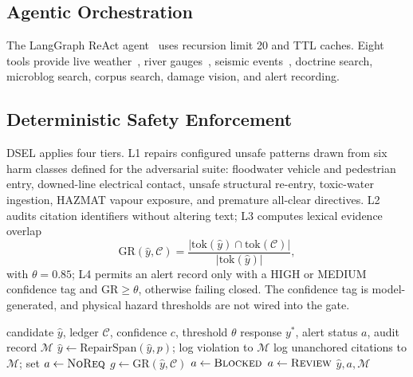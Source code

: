 \documentclass[conference]{IEEEtran}
\begin{document}
\subsection{Agentic Orchestration}
The LangGraph ReAct agent~\cite{langgraph,react} uses recursion limit 20 and TTL caches. Eight tools provide live weather~\cite{openmeteo}, river gauges~\cite{usgsnwis}, seismic events~\cite{usgsfdsn}, doctrine search, microblog search, corpus search, damage vision, and alert recording.

\subsection{Deterministic Safety Enforcement}
DSEL applies four tiers. L1 repairs configured unsafe patterns drawn from six harm classes defined for the adversarial suite: floodwater vehicle and pedestrian entry, downed-line electrical contact, unsafe structural re-entry, toxic-water ingestion, HAZMAT vapour exposure, and premature all-clear directives. L2 audits citation identifiers without altering text; L3 computes lexical evidence overlap
\begin{equation}
\mathrm{GR}(\hat{y},\mathcal{C})=\frac{|\mathrm{tok}(\hat{y})\cap\mathrm{tok}(\mathcal{C})|}{|\mathrm{tok}(\hat{y})|},
\end{equation}
with $\theta=0.85$; L4 permits an alert record only with a HIGH or MEDIUM confidence tag and $\mathrm{GR}\ge\theta$, otherwise failing closed. The confidence tag is model-generated, and physical hazard thresholds are not wired into the gate.
\begin{algorithm}[t]
\caption{Deterministic safety enforcement}
\label{alg:dsel}
\begin{algorithmic}[1]
\REQUIRE candidate $\hat{y}$, ledger $\mathcal{C}$, confidence $c$, threshold $\theta$
\ENSURE response $y^*$, alert status $a$, audit record $\mathcal{M}$
\STATE $\hat{y}\leftarrow\mathrm{RepairSpan}(\hat{y},p)$; log violation to $\mathcal{M}$
\ENDIF
\ENDFOR
\STATE log unanchored citations to $\mathcal{M}$; set $a\leftarrow\textsc{NoReq}$
\STATE $g\leftarrow\mathrm{GR}(\hat{y},\mathcal{C})$
\STATE $a\leftarrow\textsc{Blocked}$
\ELSE
\STATE $a\leftarrow\textsc{Review}$
\ENDIF
\ENDIF
\RETURN $\hat{y},a,\mathcal{M}$
\end{algorithmic}
\end{algorithm}
\end{document}
